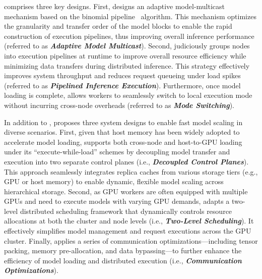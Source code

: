 \AlgoName comprises three key designs. 
First, \AlgoName designs an adaptive model-multicast mechanism based on 
the binomial pipeline~\cite{binomial-pipe} algorithm.
This mechanism optimizes the granularity and transfer order of the model blocks to enable the rapid construction of execution pipelines, thus improving overall inference performance (referred to as \textbf{\emph{Adaptive Model Multicast}}).
Second, \AlgoName judiciously groups nodes into execution pipelines at runtime to improve overall resource efficiency while minimizing data transfers during distributed inference.
This strategy effectively improves system throughput and reduces request queueing under load spikes (referred to as \textbf{\emph{Pipelined Inference Execution}}). 
Furthermore, once model loading is complete, \AlgoName allows workers to seamlessly switch to local execution mode without incurring cross-node overheads (referred to as \textbf{\emph{Mode Switching}}). 

In addition to \AlgoName, \SysName proposes three system designs to enable fast model scaling in diverse scenarios.
First, given that host memory has been widely adopted to accelerate model loading, \SysName supports both cross-node and host-to-GPU loading under its ``execute-while-load'' schemes by decoupling model transfer and execution into two separate control planes (i.e., \textbf{\emph{Decoupled Control Planes}}).
This approach seamlessly integrates replica caches from various storage tiers (e.g., GPU or host memory) to enable dynamic, flexible model scaling across hierarchical storage.
Second, as GPU workers are often equipped with multiple GPUs and need to execute models with varying GPU demands, \SysName adapts a two-level distributed scheduling framework that dynamically controls resource allocations at both the cluster and node levels (i.e., \textbf{\emph{Two-Level Scheduling}}).
It effectively simplifies model management and request executions across the GPU cluster.
Finally, \SysName applies a series of communication optimizations---including tensor packing, memory pre-allocation, and data bypassing---to further enhance the efficiency of model loading and distributed execution (i.e., \textbf{\emph{Communication Optimizations}}).

